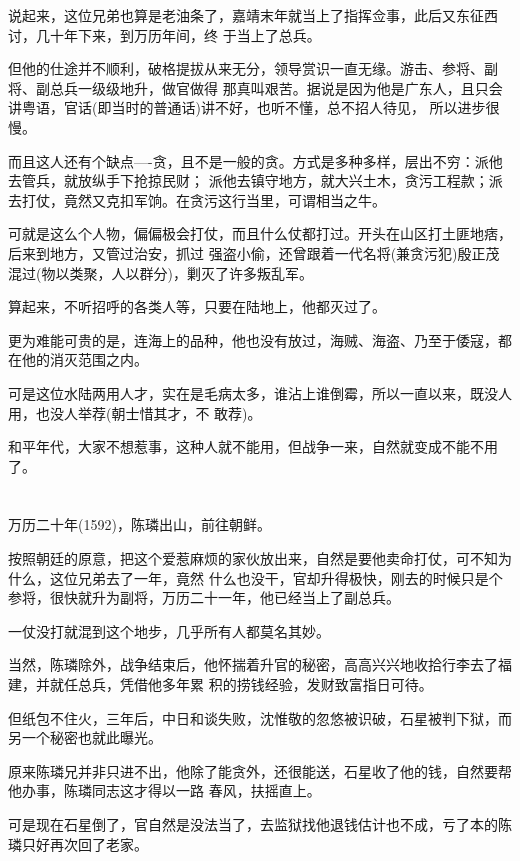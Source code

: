 \documentclass[11pt,a4paper,onecolumn]{article}
\begin{document}
说起来，这位兄弟也算是老油条了，嘉靖末年就当上了指挥佥事，此后又东征西讨，几十年下来，到万历年间，终
于当上了总兵。

但他的仕途并不顺利，破格提拔从来无分，领导赏识一直无缘。游击、参将、副将、副总兵一级级地升，做官做得
那真叫艰苦。据说是因为他是广东人，且只会讲粤语，官话(即当时的普通话)讲不好，也听不懂，总不招人待见，
所以进步很慢。

而且这人还有个缺点----贪，且不是一般的贪。方式是多种多样，层出不穷：派他去管兵，就放纵手下抢掠民财；
派他去镇守地方，就大兴土木，贪污工程款；派去打仗，竟然又克扣军饷。在贪污这行当里，可谓相当之牛。

可就是这么个人物，偏偏极会打仗，而且什么仗都打过。开头在山区打土匪地痞，后来到地方，又管过治安，抓过
强盗小偷，还曾跟着一代名将(兼贪污犯)殷正茂混过(物以类聚，人以群分)，剿灭了许多叛乱军。

算起来，不听招呼的各类人等，只要在陆地上，他都灭过了。

更为难能可贵的是，连海上的品种，他也没有放过，海贼、海盗、乃至于倭寇，都在他的消灭范围之内。

可是这位水陆两用人才，实在是毛病太多，谁沾上谁倒霉，所以一直以来，既没人用，也没人举荐(朝士惜其才，不
敢荐)。

和平年代，大家不想惹事，这种人就不能用，但战争一来，自然就变成不能不用了。

\section[\thesection]{}

万历二十年(1592)，陈璘出山，前往朝鲜。

按照朝廷的原意，把这个爱惹麻烦的家伙放出来，自然是要他卖命打仗，可不知为什么，这位兄弟去了一年，竟然
什么也没干，官却升得极快，刚去的时候只是个参将，很快就升为副将，万历二十一年，他已经当上了副总兵。

一仗没打就混到这个地步，几乎所有人都莫名其妙。

当然，陈璘除外，战争结束后，他怀揣着升官的秘密，高高兴兴地收拾行李去了福建，并就任总兵，凭借他多年累
积的捞钱经验，发财致富指日可待。

但纸包不住火，三年后，中日和谈失败，沈惟敬的忽悠被识破，石星被判下狱，而另一个秘密也就此曝光。

原来陈璘兄并非只进不出，他除了能贪外，还很能送，石星收了他的钱，自然要帮他办事，陈璘同志这才得以一路
春风，扶摇直上。

可是现在石星倒了，官自然是没法当了，去监狱找他退钱估计也不成，亏了本的陈璘只好再次回了老家。
\end{document}
